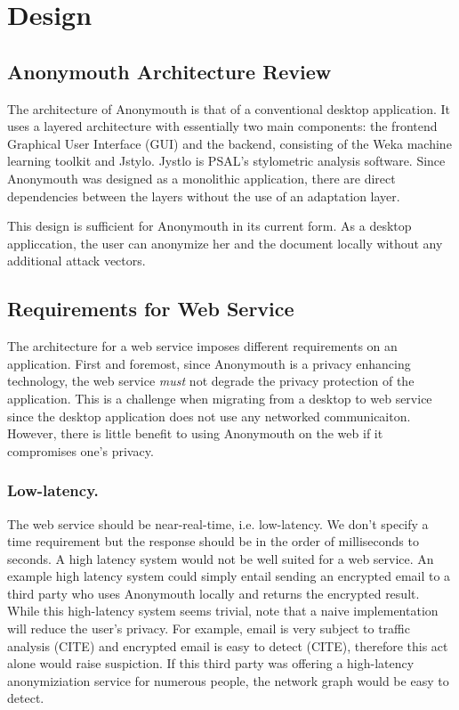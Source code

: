 \documentclass[letterpaper]{article}
\begin{document}
\section{Design}

\subsection{Anonymouth Architecture Review}

The architecture of Anonymouth is that of a conventional desktop
application.  It uses a layered architecture with essentially two main
components: the frontend Graphical User Interface (GUI) and the
backend, consisting of the Weka machine learning toolkit and Jstylo.
Jystlo is PSAL's stylometric analysis software.   Since Anonymouth was
designed as a monolithic application, there are direct dependencies
between the layers without the use of an adaptation layer.

This design is sufficient for Anonymouth in its current form.  As a
desktop appliccation, the user can anonymize her and the document
locally without any additional attack vectors.

\subsection{Requirements for Web Service}

The architecture for a web service imposes different requirements on
an application.  First and foremost, since Anonymouth is a privacy
enhancing technology, the web service \emph{must} not degrade the
privacy protection of the application.  This is a challenge when
migrating from a desktop to web service since the desktop application
does not use any networked communicaiton.  However, there is little
benefit to using Anonymouth on the web if it compromises one's
privacy.

\subsubsection{Low-latency.}
The web service should be near-real-time, i.e. low-latency.  We don't
specify a time requirement but the response should be in the order of
milliseconds to seconds.  A high latency system would not be well
suited for a web service.  An example high latency system could simply
entail sending an encrypted email to a third party who uses Anonymouth
locally and returns the encrypted result.  While this high-latency
system seems trivial, note that a naive implementation will reduce the
user's privacy.  For example, email is very subject to traffic
analysis (CITE) and encrypted email is easy to detect (CITE),
therefore this act alone would raise suspiction.  If this third party
was offering a high-latency anonymiziation service for numerous
people, the network graph would be easy to detect.
\end{document}
